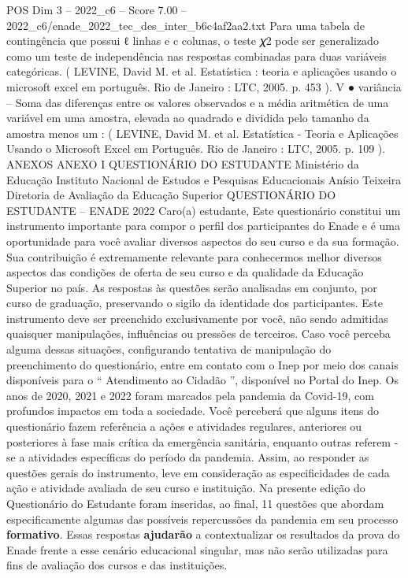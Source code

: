 \begin{textsample}{POS Dim 3 – 2022\_c6 – Score 7.00 – 2022\_c6/enade\_2022\_tec\_des\_inter\_b6c4af2aa2.txt}
Para uma tabela de contingência que possui ℓ linhas e c colunas, o teste 𝜒2 pode ser generalizado como um teste de independência nas respostas combinadas para duas variáveis categóricas. ( LEVINE, David M. et al.
Estatística : teoria e aplicações usando o microsoft excel em português.
Rio de Janeiro : LTC, 2005. p. 453 ).
V {\EmojiFont ●} variância – Soma das diferenças entre os valores observados e a média aritmética de uma variável em uma amostra, elevada ao quadrado e dividida pelo tamanho da amostra menos um : ( LEVINE, David M. et al.
Estatística - Teoria e Aplicações Usando o Microsoft Excel em Português.
Rio de Janeiro : LTC, 2005. p. 109 ).
ANEXOS ANEXO I QUESTIONÁRIO DO ESTUDANTE Ministério da Educação Instituto Nacional de Estudos e Pesquisas Educacionais Anísio Teixeira Diretoria de Avaliação da Educação Superior QUESTIONÁRIO DO ESTUDANTE – ENADE 2022 Caro(a) estudante, Este questionário constitui um instrumento importante para compor o perfil dos participantes do Enade e é uma oportunidade para você avaliar diversos aspectos do seu curso e da sua formação.
Sua contribuição é extremamente relevante para conhecermos melhor diversos aspectos das condições de oferta de seu curso e da qualidade da Educação Superior no país.
As respostas às questões serão analisadas em conjunto, por curso de graduação, preservando o sigilo da identidade dos participantes.
Este instrumento deve ser preenchido exclusivamente por você, não sendo admitidas quaisquer manipulações, influências ou pressões de terceiros.
Caso você perceba alguma dessas situações, configurando tentativa de manipulação do preenchimento do questionário, entre em contato com o Inep por meio dos canais disponíveis para o “ Atendimento ao Cidadão ”, disponível no Portal do Inep.
Os anos de 2020, 2021 e 2022 foram marcados pela pandemia da Covid-19, com profundos impactos em toda a sociedade.
Você perceberá que alguns itens do questionário fazem referência a ações e atividades regulares, anteriores ou posteriores à fase mais crítica da emergência sanitária, enquanto outras referem -se a atividades específicas do período da pandemia.
Assim, ao responder as questões gerais do instrumento, leve em consideração as especificidades de cada ação e atividade avaliada de seu curso e instituição.
Na presente edição do Questionário do Estudante foram inseridas, ao final, 11 questões que abordam especificamente algumas das possíveis repercussões da pandemia em seu processo \textbf{formativo}.
Essas respostas \textbf{ajudarão} a contextualizar os resultados da prova do Enade frente a esse cenário educacional singular, mas não serão utilizadas para fins de avaliação dos cursos e das instituições.

\end{textsample}
